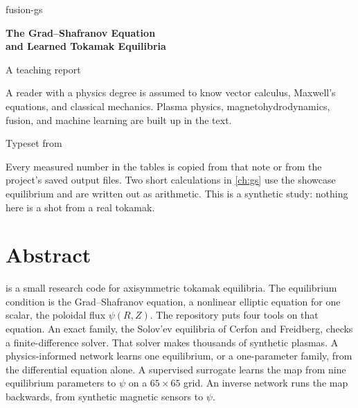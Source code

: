 \documentclass[11pt,a4paper,oneside,openany]{book}
\newcommand{\code}{\path}
\numberwithin{equation}{chapter}
\theoremstyle{definition}
\begin{document}
\frontmatter
\thispagestyle{empty}
\begin{center}
\vspace*{1.15cm}
{\large fusion-gs}\\[1.15em]
{\huge\bfseries The Grad--Shafranov Equation\\[0.22em]
and Learned Tokamak Equilibria\par}
\vspace{1.05em}
{\Large A teaching report}\\[1.6em]
\begin{minipage}{0.86\textwidth}
\centering
A reader with a physics degree is assumed to know vector calculus, Maxwell's equations, and classical mechanics. Plasma physics, magnetohydrodynamics, fusion, and machine learning are built up in the text.
\end{minipage}
\vfill
{\large Typeset from \code{docs/REPORT.md}}\\[0.55em]
\begin{minipage}{0.84\textwidth}
\centering\small
Every measured number in the tables is copied from that note or from the project's saved output files. Two short calculations in \cref{ch:gs} use the showcase equilibrium and are written out as arithmetic. This is a synthetic study: nothing here is a shot from a real tokamak.
\end{minipage}
\vspace{1.3cm}
\end{center}
\clearpage

\chapter*{Abstract}

\code{fusion-gs} is a small research code for axisymmetric tokamak equilibria. The equilibrium condition is the Grad--Shafranov equation, a nonlinear elliptic equation for one scalar, the poloidal flux \(\psi(R,Z)\). The repository puts four tools on that equation. An exact family, the Solov'ev equilibria of Cerfon and Freidberg, checks a finite-difference solver. That solver makes thousands of synthetic plasmas. A physics-informed network learns one equilibrium, or a one-parameter family, from the differential equation alone. A supervised surrogate learns the map from nine equilibrium parameters to \(\psi\) on a \(65\times 65\) grid. An inverse network runs the map backwards, from synthetic magnetic sensors to \(\psi\).
\end{document}
